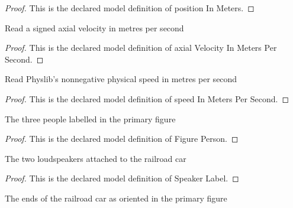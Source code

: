 \begin{proof}
  This is the declared model definition of position In Meters.
\end{proof}
\begin{definition}
  \label{def:physics:phyx-mini-0222:phyxminiproblems-problemphyxmini0222-axialvelocityinmeterspersecond}
  Read a signed axial velocity in metres per second
\end{definition}
\begin{proof}
  This is the declared model definition of axial Velocity In Meters Per Second.
\end{proof}
\begin{definition}
  \label{def:physics:phyx-mini-0222:phyxminiproblems-problemphyxmini0222-speedinmeterspersecond}
  Read Physlib's nonnegative physical speed in metres per second
\end{definition}
\begin{proof}
  This is the declared model definition of speed In Meters Per Second.
\end{proof}
\begin{definition}
  \label{def:physics:phyx-mini-0222:phyxminiproblems-problemphyxmini0222-figureperson}
  The three people labelled in the primary figure
\end{definition}
\begin{proof}
  This is the declared model definition of Figure Person.
\end{proof}
\begin{definition}
  \label{def:physics:phyx-mini-0222:phyxminiproblems-problemphyxmini0222-speakerlabel}
  The two loudspeakers attached to the railroad car
\end{definition}
\begin{proof}
  This is the declared model definition of Speaker Label.
\end{proof}
\begin{definition}
  \label{def:physics:phyx-mini-0222:phyxminiproblems-problemphyxmini0222-railroadcarend}
  The ends of the railroad car as oriented in the primary figure
\end{definition}
